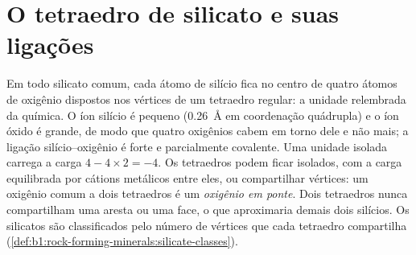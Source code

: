 \section{O tetraedro de silicato e suas ligações}

Em todo silicato comum, cada átomo de silício fica no centro de quatro átomos de oxigênio dispostos nos vértices de um tetraedro regular: a unidade  relembrada da química. O íon silício é pequeno (\qty{0.26}{\angstrom} em coordenação quádrupla) e o íon óxido é grande, de modo que quatro oxigênios cabem em torno dele e não mais; a ligação silício--oxigênio é forte e parcialmente covalente. Uma unidade isolada carrega a carga $4 - 4\times2 = -4$.
Os tetraedros podem ficar isolados, com a carga equilibrada por cátions metálicos entre eles, ou compartilhar vértices: um oxigênio comum a dois tetraedros é um \emph{oxigênio em ponte}. Dois tetraedros nunca compartilham uma aresta ou uma face, o que aproximaria demais dois silícios. Os silicatos são classificados pelo número de vértices que cada tetraedro compartilha (\cref{def:b1:rock-forming-minerals:silicate-classes}).

